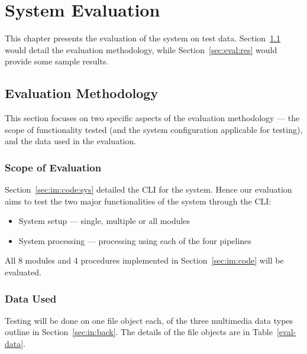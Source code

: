 \chapter{System Evaluation}

This chapter presents the evaluation of the system on test data.
Section~\ref{sec:eval:meth} would detail the evaluation methodology,
while Section~\ref{sec:eval:res} would provide some sample results.

\section{Evaluation Methodology}\label{sec:eval:meth}

This section focuses on two specific aspects of the evaluation methodology
--- the scope of functionality tested (and the system configuration applicable for
testing), and the data used in the evaluation.

\subsection{Scope of Evaluation}

Section~\ref{sec:im:code:sys} detailed the CLI for the system. Hence our evaluation
aims to test the two major functionalities of the system through the CLI\@:

\begin{itemize}
    \item System setup --- single, multiple or all modules
    \item System processing --- processing using each of the four pipelines
\end{itemize}

All 8 modules and 4 procedures implemented in Section~\ref{sec:im:code} will
be evaluated. 

\subsection{Data Used}

Testing will be done on one file object each, of the three multimedia data types
outline in Section~\ref{sec:in:back}. The details of the file objects are in
Table~\ref{eval-data}.

